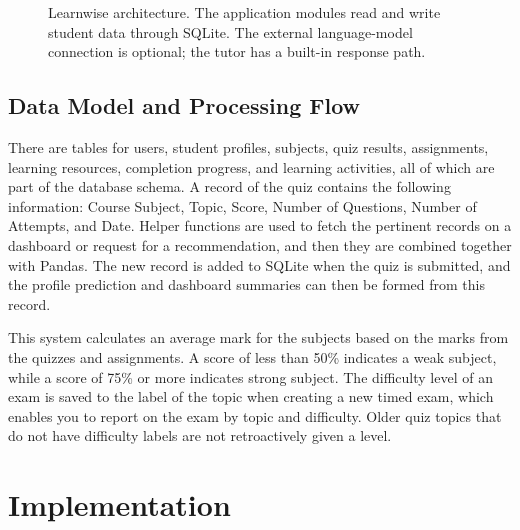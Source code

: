 \documentclass[conference]{IEEEtran}
\begin{document}
\begin{figure}[!t]
{%
}
\caption{Learnwise architecture. The application modules read and write student data through SQLite. The external language-model connection is optional; the tutor has a built-in response path.}
\label{fig:architecture}
\end{figure}

\subsection{Data Model and Processing Flow}
There are tables for users, student profiles, subjects, quiz results, assignments, learning resources, completion progress, and learning activities, all of which are part of the database schema. A record of the quiz contains the following information: Course Subject, Topic, Score, Number of Questions, Number of Attempts, and Date. Helper functions are used to fetch the pertinent records on a dashboard or request for a recommendation, and then they are combined together with Pandas. The new record is added to SQLite when the quiz is submitted, and the profile prediction and dashboard summaries can then be formed from this record.

This system calculates an average mark for the subjects based on the marks from the quizzes and assignments. A score of less than 50\% indicates a weak subject, while a score of 75\% or more indicates strong subject. The difficulty level of an exam is saved to the label of the topic when creating a new timed exam, which enables you to report on the exam by topic and difficulty. Older quiz topics that do not have difficulty labels are not retroactively given a level.
\section{Implementation}
\end{document}
